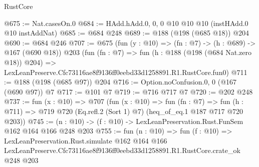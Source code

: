 \begin{lexlean}{RustCore}
\begin{coremodule}
@675 := Nat.casesOn.{0}
@684 := HAdd.hAdd.{0, 0, 0} @10 @10 @10 (instHAdd.{0} @10 instAddNat)
@685 := @684 @248
@689 := @188 (@198 (@685 @18)) @204
@690 := @684 @246
@707 := @675
    (fun (y : @10) => (fn : @7) -> (h : @689) -> @167 (@690 @18))
    @203
    (fun (fn : @7) =>
    fun (h : @188 (@198 (@684 Nat.zero @18)) @204) =>
    LexLeanPreserve.Cfc73116ae8f9136ff0eebd33d1258891.R1.RustCore.fun0)
@711 := @188 (@198 (@685 @97)) @204
@716 := Option.noConfusion.{0, 0} (@167 (@690 @97)) @7
@717 := @101 @7
@719 := @716 @717 @7
@720 := @202 @248
@737 := fun (x : @10) =>
  @707
    (fun (x : @10) =>
    fun (fn : @7) =>
    fun (h : @711) => @719 @720 (Eq.refl.{2} (Sort 1) @7) (heq_of_eq.{1} @187 @717 @720 @203))
@745 := (n : @10) -> (f : @10) -> LexLeanPreservation.Rust.FunSem @162 @164 @166 @248 @203
@755 := fun (n : @10) =>
  fun (f : @10) =>
  LexLeanPreservation.Rust.simulate
    @162
    @164
    @166
    LexLeanPreserve.Cfc73116ae8f9136ff0eebd33d1258891.R1.RustCore.crate_ok
    @248
    @203
\end{coremodule}
\end{lexlean}
